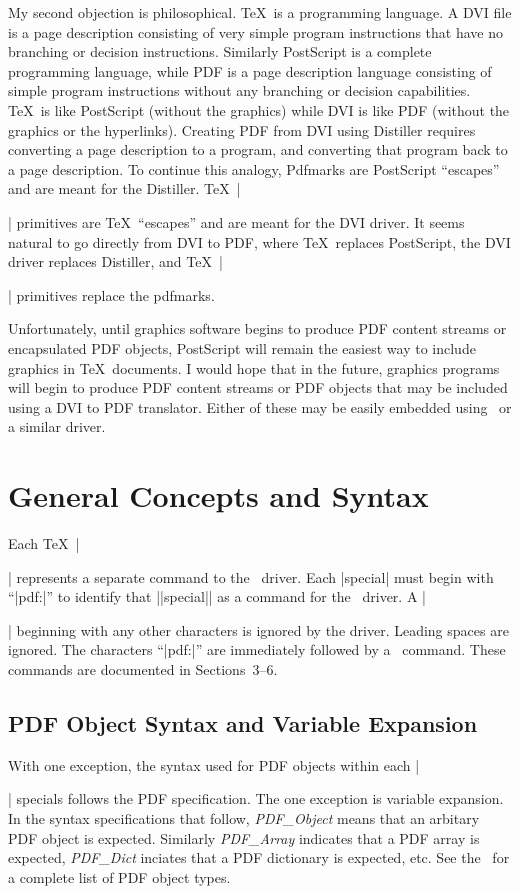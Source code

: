 My second objection is philosophical.
\TeX\ is a programming language.
A DVI file is a page description consisting of very
simple program instructions that have no branching or
decision instructions.
Similarly PostScript is a complete programming language,
while PDF is a page description language consisting
of simple program instructions
without any branching or decision capabilities.
\TeX\ is like PostScript (without the graphics)
while DVI is like PDF (without the graphics or the hyperlinks).
Creating PDF from DVI using Distiller requires converting a page description to a program,
and converting that program back to a page description.
To continue this analogy,
Pdfmarks are PostScript ``escapes'' and are meant for the Distiller.
\TeX\ |\special| primitives are \TeX\ ``escapes'' and are meant for the DVI driver.
It seems natural to go directly from DVI to PDF, where \TeX\ replaces
PostScript, the DVI driver replaces Distiller,
and \TeX\ |\special| primitives replace the pdfmarks.

Unfortunately, until graphics software
begins to produce PDF content streams or encapsulated
PDF objects, PostScript will remain the easiest
way to include graphics in \TeX\ documents.
I would hope that in the future, graphics programs
will begin to produce PDF content streams or PDF objects that
may be included using a DVI to PDF translator.  Either
of these may be easily embedded using \dvipdfm\ or a similar driver.

\section{General Concepts and Syntax}

Each \TeX\ |\special|
represents a separate command to the \dvipdfm\ 
driver.  Each |special| must begin with ``|pdf:|''
to identify that ||special|| as a command for the \dvipdfm\ driver.
A |\special| beginning with any other characters is ignored
by the driver.  Leading spaces are ignored.  The characters ``|pdf:|''
are immediately followed by a \dvipdfm\ command.  These commands
are documented in \hbox{Sections~3--6}.

\subsection{PDF Object Syntax and Variable Expansion}
With one exception, the syntax used for PDF objects
within each |\special| specials follows
the PDF specification.
The one exception is variable expansion.
In the syntax specifications that follow, {\it PDF\_Object}
means that an arbitary PDF object is expected.  Similarly
{\it PDF\_Array} indicates that a PDF array is expected, {\it PDF\_Dict}
inciates that a PDF dictionary is expected, etc.
See the \
for a complete list of PDF object types.

